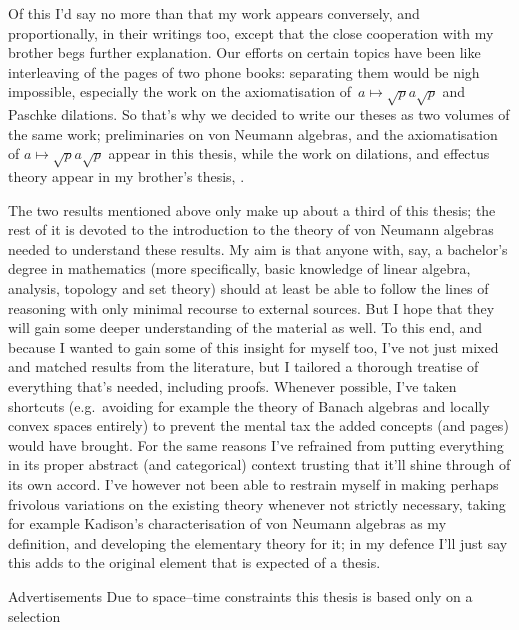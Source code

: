 \documentclass[b5paper]{book}
\begin{document}
\begin{parsec}{10}
\begin{point}{20}
Of this I'd say no more
than that my work appears conversely, and proportionally,
in their writings too, except that the close cooperation
with my brother begs further explanation.
Our efforts on certain topics have been like interleaving 
of the pages of two phone books:
separating them  would be nigh impossible,
especially the work on the axiomatisation
of~$a\mapsto \sqrt{p}a\sqrt{p}$ and Paschke dilations.
So that's why we decided to write our theses
as two volumes of the same work;
preliminaries on von Neumann algebras,
and the axiomatisation of $a\mapsto \sqrt{p}a\sqrt{p}$
appear in this thesis,
while the work on dilations,
and effectus theory appear in my brother's thesis,
\cite{bas}.
\end{point}
\begin{point}{30}
The two results mentioned above only
make up 
about a third of this thesis;
the rest of it is devoted to 
the introduction to the theory of von Neumann algebras
needed to understand these results.
My aim is that anyone 
with, say, a bachelor's degree in mathematics
(more specifically, basic knowledge of linear algebra,
analysis\cite{rudin1964principles}, 
topology\cite{willard}
and set theory\cite{devlin2012joy})
should at least be able to follow the lines of reasoning
with only minimal recourse to external sources.
But I hope that they will gain some deeper understanding
of the material as well.
To this end, and because I wanted to gain some of this insight
for myself too,
I've not just mixed
and matched
results from the literature,
but I tailored a thorough treatise
of everything that's needed,
including proofs.
Whenever possible,
I've taken shortcuts
(e.g.~avoiding for example
the theory of Banach algebras
and locally convex spaces entirely)
to  prevent the mental tax
the added concepts
(and pages) would have brought.
For the same reasons
I've refrained from putting
everything in its proper abstract (and categorical\cite{maclane}) context
trusting that it'll shine through of its own accord.
I've however not been able to restrain
myself in making perhaps frivolous variations on the existing
theory whenever not strictly necessary,
taking for example Kadison's characterisation\cite{kadison1956}
of von Neumann algebras
as my definition,
and developing the elementary theory for it;
in my defence I'll just say this adds to
the original element that is expected of a thesis.
\end{point}
\begin{point}{40}{Advertisements}%
Due to space--time constraints
this thesis is based only on a selection

\end{point}
\end{parsec}
\end{document}
